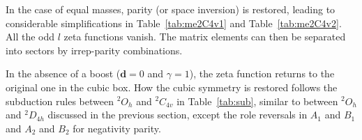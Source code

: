 \documentclass[aps,prd,reprint,showpacs,floatfix,longbibliography,,superscriptaddress]{revtex4-1}
\def\mw{\mathcal{W}}
\begin{document}
\begin{widetext}
In the case of equal masses, parity (or space inversion) is restored, leading to considerable 
simplifications in Table~\ref{tab:me2C4v1} and Table~\ref{tab:me2C4v2}. 
All the odd $l$ zeta functions vanish. The matrix elements can then be separated into sectors by irrep-parity combinations.

In the absence of a boost ($\bm d=0$ and $\gamma=1$), the zeta function returns to the original one in the 
cubic box. How the cubic symmetry is restored follows the subduction rules between $^2O_h$ and $^2C_{4v}$  in Table~\ref{tab:sub},
similar to between $^2O_h$ and $^2D_{4h}$ discussed in the previous section, 
except the role reversals in $A_1$ and $B_1$ and $A_2$ and $B_2$ for negativity parity.

%
\begin{table*}[p]
\end{table*}
\end{widetext}
\end{document}
